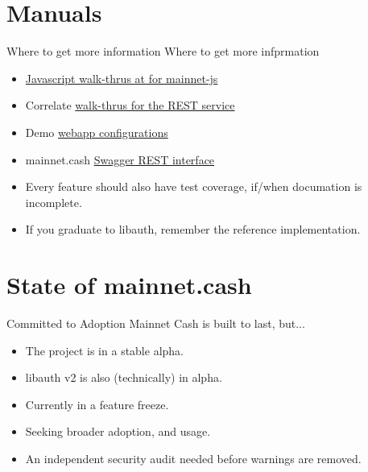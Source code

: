 \documentclass{beamer}
\begin{document}
\section{Manuals}
\begin{frame}{Where to get more information}
  Where to get more infprmation
  \begin{itemize}
  \item
     \href{https://mainnet.cash/tutorial/}{Javascript walk-thrus at for mainnet-js}
  \item
    Correlate  \href{https://mainnet.cash/tutorial/rest.html}{walk-thrus for the REST service} 
  \item
    Demo \href{https://github.com/mainnet-cash/mainnet-js/tree/master/demo}{webapp configurations}
  \item
    mainnet.cash \href{https://rest-unstable.mainnet.cash}{Swagger REST interface}
  \item
    Every feature should also have test coverage, if/when documation is incomplete.
  \item
    If you graduate to libauth, remember the reference implementation.
  \end{itemize}
  \end{frame}




\section{State of mainnet.cash}

\begin{frame}{Committed to Adoption}
Mainnet Cash is built to last, but...
\begin{itemize}
\item
    The project is in a \alert{stable alpha}. 
    \item
    libauth v2 is also (technically) in alpha.
\item
    Currently in a \alert{feature freeze}.
\item
    Seeking \alert{broader adoption}, and usage.
\item
    An independent \alert{security audit} needed before warnings are removed.
\end{itemize}
\end{frame}
\end{document}
